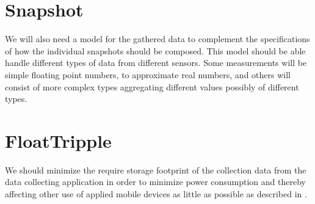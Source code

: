 
\section{Snapshot}
\label{sec:snapshot}

We will also need a model for the gathered data to complement the specifications of how the individual snapshots should be composed. This model should be able handle different types of data from different sensors. Some measurements will be simple floating point numbers, to approximate real numbers, and others will consist of more complex types aggregating different values possibly of different types.  

\section{FloatTripple}
We should minimize the require storage footprint of the collection data from the data collecting application in order to minimize power consumption and thereby affecting other use of applied mobile devices as little as possible as described in .

